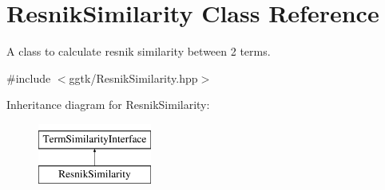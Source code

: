 \hypertarget{classResnikSimilarity}{}\section{Resnik\+Similarity Class Reference}
\label{classResnikSimilarity}


A class to calculate resnik similarity between 2 terms.  




{\ttfamily \#include $<$ggtk/\+Resnik\+Similarity.\+hpp$>$}

Inheritance diagram for Resnik\+Similarity\+:\begin{figure}[H]
\begin{center}
\leavevmode
\includegraphics[height=2.000000cm]{classResnikSimilarity}
\end{center}
\end{figure}
